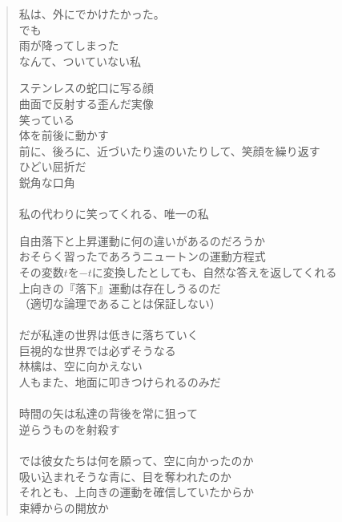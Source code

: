 \documentclass[../IHMain]{subfiles}
\begin{document}
\begin{verse}
        私は、外にでかけたかった。\\
        でも\\
        雨が降ってしまった\\
        なんて、ついていない私

        \newpage

        ステンレスの蛇口に写る顔\\
        曲面で反射する歪んだ実像\\
        笑っている\\
        体を前後に動かす\\
        前に、後ろに、近づいたり遠のいたりして、笑顔を繰り返す\\
        ひどい屈折だ\\
        鋭角な口角\\　\\

        私の代わりに笑ってくれる、唯一の私

        \newpage

        自由落下と上昇運動に何の違いがあるのだろうか\\
        おそらく習ったであろうニュートンの運動方程式\\
        その変数$t$を$-t$に変換したとしても、自然な答えを返してくれる\\
        上向きの『落下』運動は存在しうるのだ\\
        （適切な論理であることは保証しない）\\　\\

        だが私達の世界は低きに落ちていく\\
        巨視的な世界では必ずそうなる\\
        林檎は、空に向かえない\\
        人もまた、地面に叩きつけられるのみだ\\　\\

        時間の矢は私達の背後を常に狙って\\
        逆らうものを射殺す\\　\\

        では彼女たちは何を願って、空に向かったのか\\
        吸い込まれそうな青に、目を奪われたのか\\
        それとも、上向きの運動を確信していたからか\\
        束縛からの開放か\\
    \end{verse}
\end{document}
